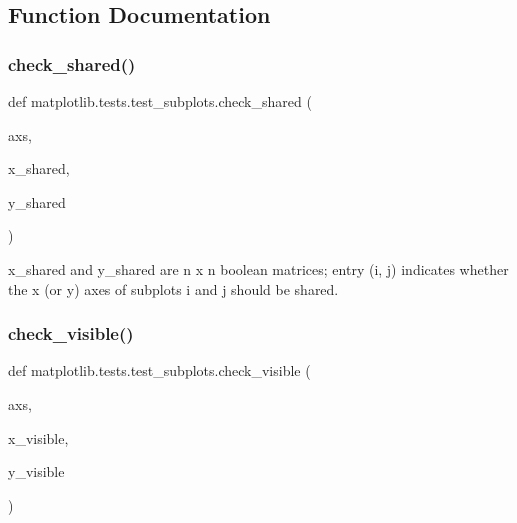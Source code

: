 \subsection{Function Documentation}
\mbox{\label{namespacematplotlib_1_1tests_1_1test__subplots_a661299a0348986664c158bbc5e8bdaf9}} 
\subsubsection{\texorpdfstring{check\+\_\+shared()}{check\_shared()}}
{\footnotesize\ttfamily def matplotlib.\+tests.\+test\+\_\+subplots.\+check\+\_\+shared (\begin{DoxyParamCaption}\item[{}]{axs,  }\item[{}]{x\+\_\+shared,  }\item[{}]{y\+\_\+shared }\end{DoxyParamCaption})}

\begin{DoxyVerb}x_shared and y_shared are n x n boolean matrices; entry (i, j) indicates
whether the x (or y) axes of subplots i and j should be shared.
\end{DoxyVerb}
 \mbox{\label{namespacematplotlib_1_1tests_1_1test__subplots_a14b8b004b84698b48efe4f190a284c81}} 
\subsubsection{\texorpdfstring{check\+\_\+visible()}{check\_visible()}}
{\footnotesize\ttfamily def matplotlib.\+tests.\+test\+\_\+subplots.\+check\+\_\+visible (\begin{DoxyParamCaption}\item[{}]{axs,  }\item[{}]{x\+\_\+visible,  }\item[{}]{y\+\_\+visible }\end{DoxyParamCaption})}

